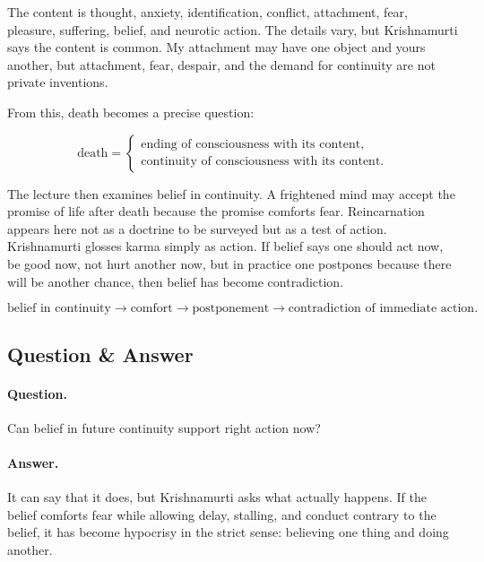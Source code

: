 \documentclass[11pt,oneside]{book}
\begin{document}
The content is thought, anxiety, identification, conflict, attachment, fear, pleasure, suffering, belief, and neurotic action. The details vary, but Krishnamurti says the content is common. My attachment may have one object and yours another, but attachment, fear, despair, and the demand for continuity are not private inventions.

From this, death becomes a precise question:

\begin{equation}
\text{death}
=
\begin{cases}
\text{ending of consciousness with its content},\\
\text{continuity of consciousness with its content}.
\end{cases}
\end{equation}

The lecture then examines belief in continuity. A frightened mind may accept the promise of life after death because the promise comforts fear. Reincarnation appears here not as a doctrine to be surveyed but as a test of action. Krishnamurti glosses karma simply as action. If belief says one should act now, be good now, not hurt another now, but in practice one postpones because there will be another chance, then belief has become contradiction.

\begin{equation}
\text{belief in continuity}
\longrightarrow
\text{comfort}
\longrightarrow
\text{postponement}
\longrightarrow
\text{contradiction of immediate action}.
\end{equation}

\subsection{Question \& Answer}

\paragraph{Question.}
Can belief in future continuity support right action now?

\paragraph{Answer.}
It can say that it does, but Krishnamurti asks what actually happens. If the belief comforts fear while allowing delay, stalling, and conduct contrary to the belief, it has become hypocrisy in the strict sense: believing one thing and doing another.
\end{document}
